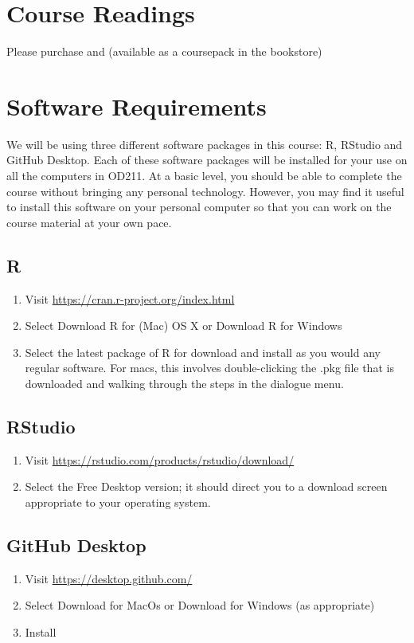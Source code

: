\documentclass{article}
\begin{document}
\section*{Course Readings}
Please purchase 
 and  (available as a coursepack in the bookstore)
\section*{Software Requirements}
We will be using three different software packages in this course: R, RStudio and GitHub Desktop. Each of these software packages will be installed for your use on all the computers in OD211. At a basic level, you should be able to complete the course without bringing any personal technology. However, you may find it useful to install this software on your personal computer so that you can work on the course material at your own pace. 

\subsection*{R}
\begin{enumerate}
\item Visit \url{https://cran.r-project.org/index.html}
\item Select Download R for (Mac) OS X or Download R for Windows
\item Select the latest package of R for download and install as you would any regular software. For macs, this involves double-clicking the .pkg file that is downloaded and walking through the steps in the dialogue menu. 
\end{enumerate}

\subsection*{RStudio }

\begin{enumerate}
\item Visit \url{https://rstudio.com/products/rstudio/download/}
\item Select the Free Desktop version; it should direct you to a download screen appropriate to your operating system. 
\end{enumerate}

\subsection*{GitHub Desktop}
\begin{enumerate}
\item Visit \url{https://desktop.github.com/}
\item Select Download for MacOs or Download for Windows (as appropriate)
\item Install
\end{enumerate}
\end{document}
